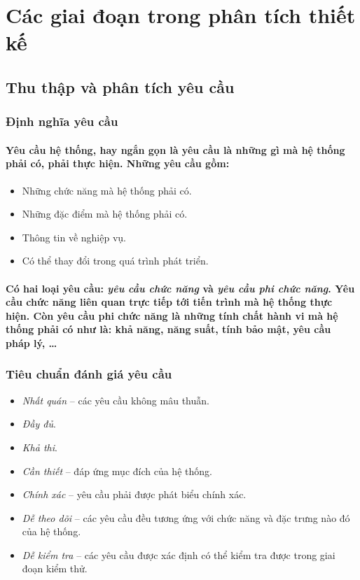 \documentclass{article}
\begin{document}
\section{Các giai đoạn trong phân tích thiết kế}

  \subsection{Thu thập và phân tích yêu cầu}
  
  \subsubsection{Định nghĩa yêu cầu}
    \paragraph{\textnormal{
      \textbf{Yêu cầu hệ thống}, hay ngắn gọn là \textbf{yêu cầu} là những gì mà hệ thống phải có, phải thực hiện. Những yêu cầu gồm:
    }}
    \begin{itemize}
      \item Những chức năng mà hệ thống phải có.
      \item Những đặc điểm mà hệ thống phải có.
      \item Thông tin về nghiệp vụ.
      \item Có thể thay đổi trong quá trình phát triển.
    \end{itemize}

    \paragraph{\textnormal{
      Có hai loại yêu cầu: \textit{yêu cầu chức năng} và \textit{yêu cầu phi chức năng}. Yêu cầu chức năng liên quan trực tiếp tới tiến trình mà hệ thống thực hiện. Còn yêu cầu phi chức năng là những tính chất hành vi mà hệ thống phải có như là: khả năng, năng suất, tính bảo mật, yêu cầu pháp lý, \ldots
    }}
  
  \subsubsection{Tiêu chuẩn đánh giá yêu cầu}
    \begin{itemize}
      \item \textit{Nhất quán} -- các yêu cầu không mâu thuẫn.
      \item \textit{Đầy đủ}.
      \item \textit{Khả thi}.
      \item \textit{Cần thiết} -- đáp ứng mục đích của hệ thống.
      \item \textit{Chính xác} -- yêu cầu phải được phát biểu chính xác.
      \item \textit{Dễ theo dõi} -- các yêu cầu đều tương ứng với chức năng và đặc trưng nào đó của hệ thống.
      \item \textit{Dễ kiểm tra} -- các yêu cầu được xác định có thể kiểm tra được trong giai đoạn kiểm thử.
    \end{itemize}
  
\end{document}
